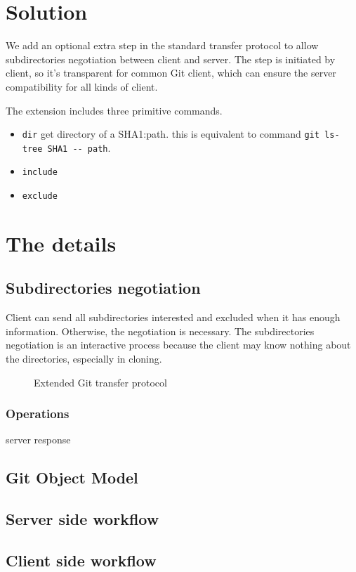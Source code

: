 \documentclass[preprint]{sigplanconf}
\begin{document}
\section{Solution}
We add an optional extra step in the standard transfer protocol to allow subdirectories negotiation between client and server.
The step is initiated by client, so it's transparent for common Git client, which can ensure the server compatibility for all kinds of client.

The extension includes three primitive commands.
\begin{itemize}
  \item \verb|dir| get directory of a SHA1:path.
    this is equivalent to command \verb|git ls-tree SHA1 -- path|.
  \item \verb|include| 
  \item \verb|exclude|
\end{itemize}

\section{The details}

\subsection{Subdirectories negotiation}
Client can send all subdirectories interested and excluded when it has enough information.
Otherwise, the negotiation is necessary.
The subdirectories negotiation is an interactive process because the client may know nothing about the directories, especially in cloning.
\begin{figure}
  \centering
  
  \caption{Extended Git transfer protocol}
  \label{fig:git-proto-ext-seq}
\end{figure}
\subsubsection{Operations}
server response

\subsection{Git Object Model}
\subsection{Server side workflow}
\subsection{Client side workflow}
\end{document}
